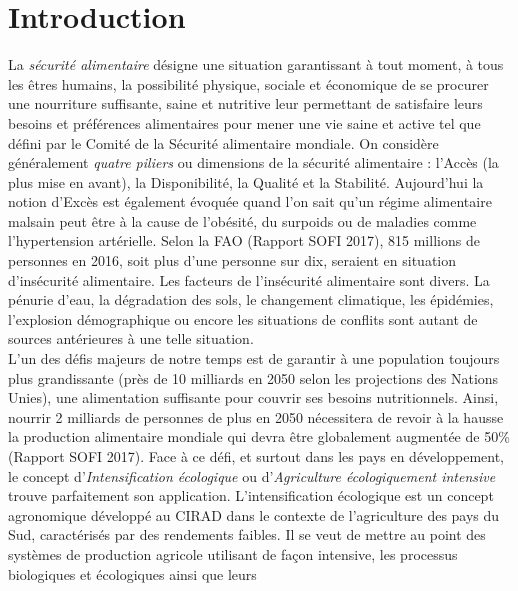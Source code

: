 
\section{Introduction}

La \emph{sécurité alimentaire} désigne \og une situation garantissant à tout moment, à tous les êtres humains, la possibilité physique, sociale et économique 
de se procurer une nourriture suffisante, saine et nutritive leur permettant de satisfaire leurs besoins et préférences alimentaires pour mener une vie saine et active \fg{}
tel que défini par le Comité de la Sécurité alimentaire mondiale. On considère généralement \emph {quatre piliers} ou dimensions de la sécurité alimentaire : l'Accès (la plus mise 
en avant), la Disponibilité, la Qualité et la Stabilité. Aujourd'hui la notion d'Excès est également évoquée quand l'on sait qu'un régime alimentaire malsain peut être à la cause 
de l'obésité, du surpoids ou de maladies comme l'hypertension artérielle. Selon la FAO (Rapport SOFI 2017), 815 millions de personnes en 2016, soit plus d'une personne sur dix, 
seraient en situation d'insécurité alimentaire. Les facteurs de l'insécurité alimentaire sont divers. La pénurie d'eau, la dégradation des sols, le changement climatique, les épidémies, 
l'explosion démographique ou encore les situations de conflits sont autant de sources antérieures à une telle situation. \\L'un des défis majeurs de notre temps est de garantir à une 
population toujours plus grandissante (près de 10 milliards en 2050 selon les projections des Nations Unies), une alimentation suffisante pour couvrir ses besoins nutritionnels. 
Ainsi, nourrir 2 milliards de personnes de plus en 2050 nécessitera de revoir à la hausse la production alimentaire mondiale qui devra être globalement augmentée de 50\% (Rapport SOFI 
2017). Face à ce défi, et surtout dans les pays en développement, le concept \og d'\emph{Intensification écologique} ou d'\emph{Agriculture écologiquement intensive} \fg{} trouve 
parfaitement son application. L'intensification écologique est un concept agronomique développé au CIRAD dans le contexte de l'agriculture des pays du Sud, caractérisés par des 
rendements faibles. Il se veut de mettre au point des systèmes de production agricole utilisant de façon intensive, les processus biologiques et écologiques ainsi que leurs 
